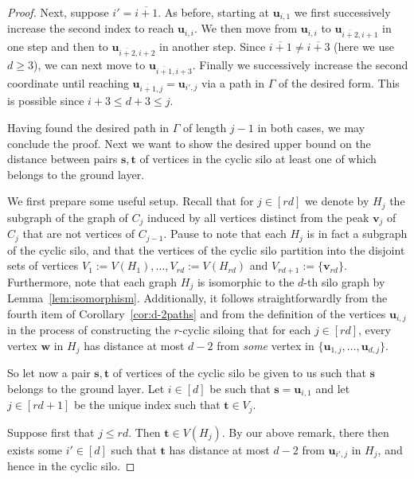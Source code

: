 \documentclass[centering,11pt,reqno]{amsart}
\theoremstyle{definition}
\newenvironment{claimproof}[1][\proofname]{\proof[#1]\renewcommand{\qedsymbol}{$\blacksquare$}}{\endproof}
\begin{document}
\begin{proof}
\begin{claimproof}
Next, suppose $i'=\overline{i+1}$. As before, starting at $\mathbf{u}_{i,1}$ we first successively increase the second index to reach $\mathbf{u}_{i,i}$. We then move from $\mathbf{u}_{i,i}$ to $\mathbf{u}_{\overline{i+2},i+1}$ in one step and then to $\mathbf{u}_{\overline{i+2},i+2}$ in another step. Since $\overline{i+1}\neq \overline{i+3}$ (here we use $d\ge 3$), we can next move to $\mathbf{u}_{\overline{i+1}, i+3}$. Finally we successively increase the second coordinate until reaching $\mathbf{u}_{\overline{i+1},j}=\mathbf{u}_{i',j}$ via a path in $\Gamma$ of the desired form. This is possible since $i+3\le d+3\le j$.

Having found the desired path in $\Gamma$ of length $j-1$ in both cases, we may conclude the proof.
\end{claimproof}
Next we want to show the desired upper bound on the distance between pairs $\mathbf{s},\mathbf{t}$ of vertices in the cyclic silo at least one of which belongs to the ground layer.

We first prepare some useful setup. Recall that for $j\in [rd]$ we denote by $H_j$ the subgraph of the graph of $C_j$ induced by all vertices distinct from the peak $\mathbf{v}_j$ of $C_j$ that are not vertices of $C_{j-1}$. Pause to note that each $H_j$ is in fact a subgraph of the cyclic silo, and that the vertices of the cyclic silo partition into the disjoint sets of vertices $V_1:=V(H_1),\ldots,V_{rd}:=V(H_{rd})$ and $V_{rd+1}:=\{\mathbf{v}_{rd}\}$. Furthermore, note that each graph $H_j$ is isomorphic to the $d$-th silo graph by Lemma~\ref{lem:isomorphism}. Additionally, it follows straightforwardly from the fourth item of Corollary~\ref{cor:d-2paths} and from the definition of the vertices $\mathbf{u}_{i,j}$ in the process of constructing the $r$-cyclic siloing that for each $j\in [rd]$, every vertex $\mathbf{w}$ in $H_j$ has distance at most $d-2$ from \emph{some} vertex in $\{\mathbf{u}_{1,j},\ldots,\mathbf{u}_{d,j}\}$.

So let now a pair $\mathbf{s},\mathbf{t}$ of vertices of the cyclic silo be given to us such that $\mathbf{s}$ belongs to the ground layer. Let $i\in [d]$ be such that $\mathbf{s}=\mathbf{u}_{i,1}$ and let $j\in [rd+1]$ be the unique index such that $\mathbf{t}\in V_{j}$.

Suppose first that $j\le rd$. Then $\mathbf{t}\in V(H_j)$. By our above remark, there then exists some $i'\in [d]$ such that $\mathbf{t}$ has distance at most $d-2$ from $\mathbf{u}_{i',j}$ in $H_j$, and hence in the cyclic silo.


\end{proof}
\end{document}

